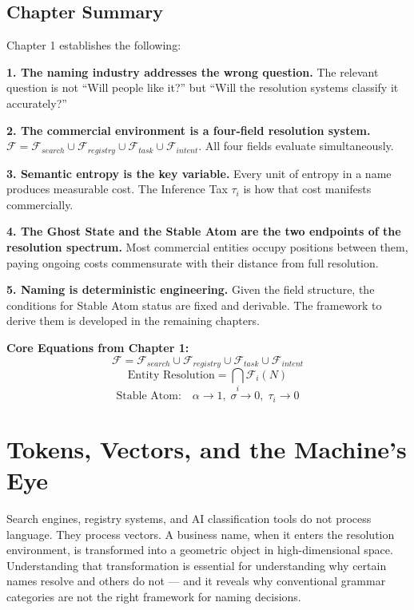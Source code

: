 \documentclass[12pt, openany]{book}
\theoremstyle{thmstyle}
\theoremstyle{defstyle}
\newcommand{\taui}{\tau_i}
\begin{document}
\section{Chapter Summary}

Chapter 1 establishes the following:

\textbf{1. The naming industry addresses the wrong question.} The relevant question is not ``Will people like it?'' but ``Will the resolution systems classify it accurately?''

\textbf{2. The commercial environment is a four-field resolution system.} $\mathcal{F} = \mathcal{F}_{search} \cup \mathcal{F}_{registry} \cup \mathcal{F}_{task} \cup \mathcal{F}_{intent}$. All four fields evaluate simultaneously.

\textbf{3. Semantic entropy is the key variable.} Every unit of entropy in a name produces measurable cost. The Inference Tax $\taui$ is how that cost manifests commercially.

\textbf{4. The Ghost State and the Stable Atom are the two endpoints of the resolution spectrum.} Most commercial entities occupy positions between them, paying ongoing costs commensurate with their distance from full resolution.

\textbf{5. Naming is deterministic engineering.} Given the field structure, the conditions for Stable Atom status are fixed and derivable. The framework to derive them is developed in the remaining chapters.

\begin{equationbox}
\textbf{Core Equations from Chapter 1:}
\[
\mathcal{F} = \mathcal{F}_{search} \cup \mathcal{F}_{registry} \cup \mathcal{F}_{task} \cup \mathcal{F}_{intent}
\]
\[
\text{Entity Resolution} = \bigcap_{i} \mathcal{F}_i(N)
\]
\[
\text{Stable Atom:} \quad \alpha \to 1,\; \sigma \to 0,\; \tau_i \to 0
\]
\end{equationbox}

\chapter{Tokens, Vectors, and the Machine's Eye}

\begin{keybox}
Search engines, registry systems, and AI classification tools do not process language. They process vectors. A business name, when it enters the resolution environment, is transformed into a geometric object in high-dimensional space. Understanding that transformation is essential for understanding why certain names resolve and others do not --- and it reveals why conventional grammar categories are not the right framework for naming decisions.
\end{keybox}
\end{document}

